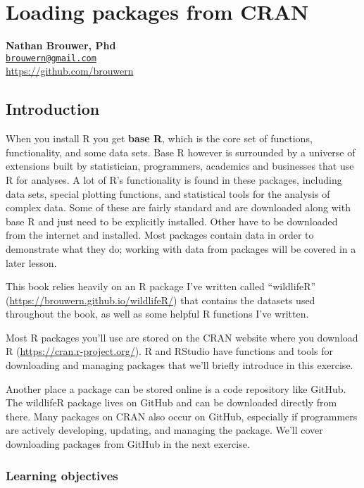 \documentclass[]{book}
\theoremstyle{definition}
\theoremstyle{definition}
\theoremstyle{definition}
\theoremstyle{remark}
\begin{document}
\chapter{Loading packages from CRAN}\label{loading-packages-from-cran}

\textbf{Nathan Brouwer, Phd}\\
\href{mailto:brouwern@gmail.com}{\nolinkurl{brouwern@gmail.com}}\\
\url{https://github.com/brouwern}\\
\citet{lobrowR}

\section{Introduction}\label{introduction}

When you install R you get \textbf{base R}, which is the core set of
functions, functionality, and some data sets. Base R however is
surrounded by a universe of extensions built by statistician,
programmers, academics and businesses that use R for analyses. A lot of
R's functionality is found in these packages, including data sets,
special plotting functions, and statistical tools for the analysis of
complex data. Some of these are fairly standard and are downloaded along
with base R and just need to be explicitly installed. Other have to be
downloaded from the internet and installed. Most packages contain data
in order to demonstrate what they do; working with data from packages
will be covered in a later lesson.

This book relies heavily on an R package I've written called
``wildlifeR'' (\url{https://brouwern.github.io/wildlifeR/}) that
contains the datasets used throughout the book, as well as some helpful
R functions I've written.

Most R packages you'll use are stored on the CRAN website where you
download R (\url{https://cran.r-project.org/}). R and RStudio have
functions and tools for downloading and managing packages that we'll
briefly introduce in this exercise.

Another place a package can be stored online is a code repository like
GitHub. The wildlifeR package lives on GitHub and can be downloaded
directly from there. Many packages on CRAN also occur on GitHub,
especially if programmers are actively developing, updating, and
managing the package. We'll cover downloading packages from GitHub in
the next exercise.

\subsection{Learning objectives}\label{learning-objectives}
\end{document}
